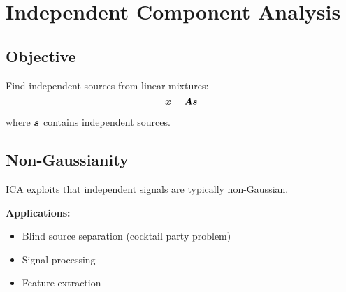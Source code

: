 
\section{Independent Component Analysis}
\label{sec:ica}

\subsection{Objective}

Find independent sources from linear mixtures:
\begin{equation}
\boldsymbol{x} = \boldsymbol{A}\boldsymbol{s}
\end{equation}

where $\boldsymbol{s}$ contains independent sources.

\subsection{Non-Gaussianity}

ICA exploits that independent signals are typically non-Gaussian.

\textbf{Applications:}
\begin{itemize}
    \item Blind source separation (cocktail party problem)
    \item Signal processing
    \item Feature extraction
\end{itemize}


